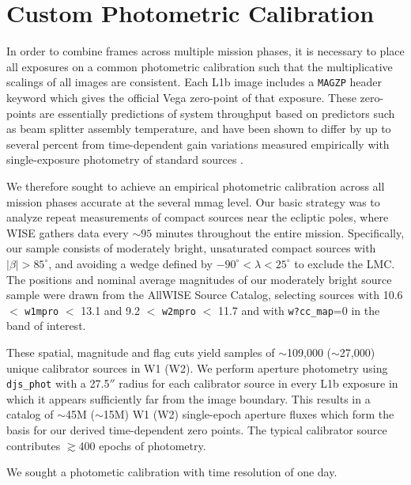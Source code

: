 \documentclass{emulateapj}
\begin{document}

\section{Custom Photometric Calibration}
\label{sec:calib}
In order to combine frames across multiple mission phases, it is necessary
to place all exposures on a common photometric calibration such that
the multiplicative scalings of all images are consistent. Each L1b
image includes a \verb|MAGZP| header keyword which gives the official
Vega zero-point of that exposure. These zero-points are essentially
predictions of system throughput based on predictors such as beam splitter
assembly temperature, and have been shown to differ by up to several percent 
from time-dependent gain variations measured empirically with single-exposure
photometry of standard sources \citep{cutri13, cutri15}.

We therefore sought to achieve an empirical photometric calibration
across all mission phases accurate at the several mmag level. Our basic
strategy was to analyze repeat measurements of compact sources near the 
ecliptic poles, where WISE gathers data every $\sim$$95$ minutes throughout the 
entire mission. Specifically, our sample consists of moderately bright,
unsaturated compact sources with $|\beta| > 85^{\circ}$, and avoiding a wedge 
defined by $-90^{\circ}$$<$$\lambda$$<25^{\circ}$ to exclude the LMC. The 
positions and nominal average magnitudes of our moderately bright source
sample were drawn from the AllWISE Source Catalog, selecting sources with 
10.6 $<$ \verb|w1mpro| $<$ 13.1 and 9.2 $<$ \verb|w2mpro| $<$ 11.7 and with
\verb|w?cc_map|=0 in the band of interest.

These spatial, magnitude and flag cuts yield samples of $\sim$109,000 
($\sim$27,000) unique calibrator sources in W1 (W2). We perform aperture 
photometry using \verb|djs_phot| with a 27.5$''$ radius for each calibrator 
source in every L1b exposure in which it appears sufficiently far from the 
image boundary. This results in a catalog of $\sim$45M ($\sim$15M) W1 (W2) 
single-epoch aperture fluxes which form the basis for our derived 
time-dependent zero points. The typical calibrator source contributes 
$\gtrsim$400 epochs of photometry.

We sought a photometic calibration with time resolution of one day. 
\end{document}
